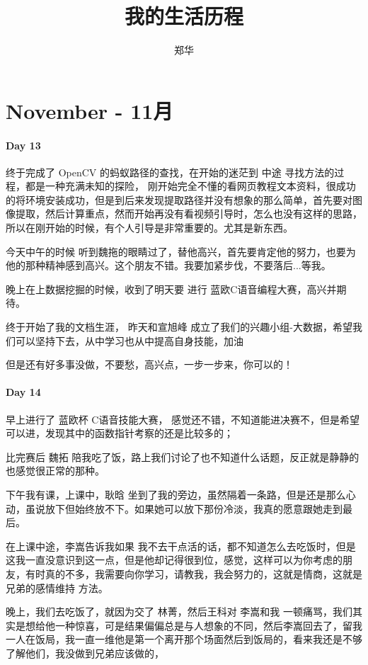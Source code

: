 \documentclass[UTF8,a4paper,8pt]{ctexart}
\author{郑华}
\title{我的生活历程}
\begin{document}
 
 	\maketitle
 		 \section{November - 11月}
 		 \paragraph{Day 13}
 		 终于完成了 OpenCV 的蚂蚁路径的查找，在开始的迷茫到 中途 寻找方法的过程，都是一种充满未知的探险， 刚开始完全不懂的看网页教程文本资料，很成功的将环境安装成功，但是到后来发现提取路径并没有想象的那么简单，首先要对图像提取，然后计算重点，然而开始再没有看视频引导时，怎么也没有这样的思路， 所以在刚开始的时候，有个人引导是非常重要的。尤其是新东西。
 		 
 		 今天中午的时候 听到魏拖的眼睛过了，替他高兴，首先要肯定他的努力，也要为他的那种精神感到高兴。这个朋友不错。我要加紧步伐，不要落后...等我。
 		 
 		 晚上在上数据挖掘的时候，收到了明天要 进行 蓝欧C语音编程大赛，高兴并期待。
 		 
 		 终于开始了我的文档生涯， 昨天和宣旭峰 成立了我们的兴趣小组-大数据，希望我们可以坚持下去，从中学习也从中提高自身技能，加油
 		 
 		 但是还有好多事没做，不要愁，高兴点，一步一步来，你可以的！
 		 
 		  \paragraph{Day 14}
 		  早上进行了 蓝欧杯 C语音技能大赛， 感觉还不错，不知道能进决赛不，但是希望可以进，发现其中的函数指针考察的还是比较多的；
 		  
 		  比完赛后 魏拓 陪我吃了饭，路上我们讨论了也不知道什么话题，反正就是静静的也感觉很正常的那种。
 		  
 		  下午我有课，上课中，耿晗 坐到了我的旁边，虽然隔着一条路，但是还是那么心动，虽说放下但始终放不下。如果她可以放下那份冷淡，我真的愿意跟她走到最后。
 		  
 		  在上课中途，李嵩告诉我如果 我不去干点活的话，都不知道怎么去吃饭时，但是这我一直没意识到这一点，但是他却记得很到位，感觉，这样可以为你考虑的朋友，有时真的不多，我需要向你学习，请教我，我会努力的，这就是情商，这就是兄弟的感情维持 方法。
 		  
 		  
 		  晚上，我们去吃饭了，就因为交了 林菁，然后王科对 李嵩和我 一顿痛骂，我们其实是想给他一种惊喜，可是结果偏偏总是与人想象的不同，然后李嵩回去了，留我一人在饭局，我一直一维他是第一个离开那个场面然后到饭局的，看来我还是不够了解他们，我没做到兄弟应该做的，
 		  
\end{document}
